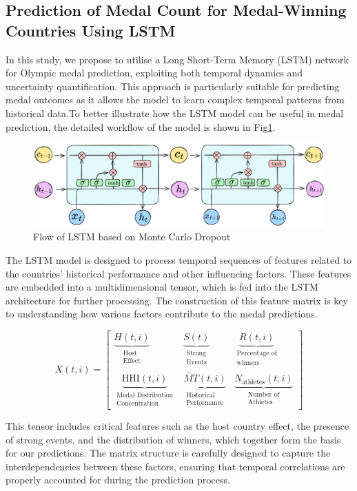 \documentclass{mcmthesis}
\newenvironment{featurebox}[1]{%
	\begin{tcolorbox}[
		colback=white,                  %
		colframe=customblue,            %
		colbacktitle=customblue,        %
		coltitle=deepblue,              %
		arc=3mm,                        %
		boxrule=1.5pt,                  %
		title={\large\bfseries #1},     %
		fonttitle=\sffamily,            %
		top=10pt,                       %
		bottom=10pt,                    %
		left=10pt,                      %
		right=10pt,                     %
		]
	}{\end{tcolorbox}}
\begin{document}
	
	\subsection{Prediction of Medal Count for Medal-Winning Countries Using LSTM}
	In this study, we propose to utilise a Long Short-Term Memory (LSTM) network \cite{Gal2015DropoutAA} for Olympic medal prediction, exploiting both temporal dynamics and uncertainty quantification. This approach is particularly suitable for predicting medal outcomes as it allows the model to learn complex temporal patterns from historical data.To better illustrate how the LSTM model can be useful in medal prediction, the detailed workflow of the model is shown in Fig\ref{fig:LSTM}.


	\begin{figure}[H]
		\centering
		\includegraphics[width=1\linewidth]{fig/LSTM2.png}
		\caption{Flow of LSTM based on Monte Carlo Dropout}
		\label{fig:LSTM}
	\end{figure}
	The LSTM model is designed to process temporal sequences of features related to the countries' historical performance and other influencing factors. These features are embedded into a multidimensional tensor, which is fed into the LSTM architecture for further processing. The construction of this feature matrix is key to understanding how various factors contribute to the medal predictions.
\begin{featurebox}{Multidimensional Tensor Construction}
	\[
	X(t,i) = \begin{bmatrix}
		\underbrace{H(t,i)}_{\substack{\text{Host}\\ \text{Effect}}} & 
		\underbrace{S(t)}_{\substack{\text{Strong}\\ \text{Events}}} & 
		\underbrace{R(t,i)}_{\substack{\text{Percentage of}\\ \text{winners}}} \\
		\underbrace{\text{HHI}(t,i)}_{\substack{\text{Medal Distribution}\\ \text{Concentration}}} & 
		\underbrace{\widetilde{MT}(t,i)}_{\substack{\text{Historical}\\ \text{Performance}}} &
		\underbrace{N_{\text{athletes}}(t,i)}_{\substack{\text{Number of}\\ \text{Athletes}}}
	\end{bmatrix}
	\]
\end{featurebox}
This tensor includes critical features such as the host country effect, the presence of strong events, and the distribution of winners, which together form the basis for our predictions. The matrix structure is carefully designed to capture the interdependencies between these factors, ensuring that temporal correlations are properly accounted for during the prediction process.
\end{document}
